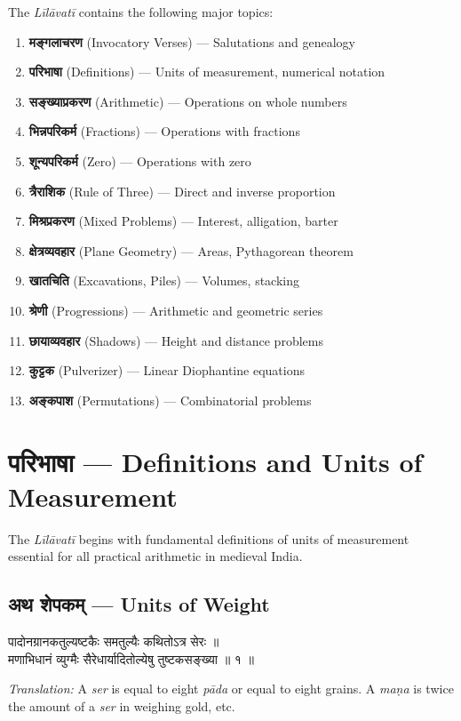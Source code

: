 \documentclass[10pt,a4paper]{article}
\newenvironment{sanskritverse}{%
  \begin{center}%
  \begin{minipage}{0.94\textwidth}%
  \centering\devanagarifont\small%
}{%
  \end{minipage}%
  \end{center}%
  \vspace{0.1em}%
}
\begin{document}
The \textit{Līlāvatī} contains the following major topics:
\begin{enumerate}[label=\arabic*., leftmargin=*,itemsep=0pt]
\item \textbf{मङ्गलाचरण} (Invocatory Verses) --- Salutations and genealogy
\item \textbf{परिभाषा} (Definitions) --- Units of measurement, numerical notation
\item \textbf{सङ्ख्याप्रकरण} (Arithmetic) --- Operations on whole numbers
\item \textbf{भिन्नपरिकर्म} (Fractions) --- Operations with fractions
\item \textbf{शून्यपरिकर्म} (Zero) --- Operations with zero
\item \textbf{त्रैराशिक} (Rule of Three) --- Direct and inverse proportion
\item \textbf{मिश्रप्रकरण} (Mixed Problems) --- Interest, alligation, barter
\item \textbf{क्षेत्रव्यवहार} (Plane Geometry) --- Areas, Pythagorean theorem
\item \textbf{खातचिति} (Excavations, Piles) --- Volumes, stacking
\item \textbf{श्रेणी} (Progressions) --- Arithmetic and geometric series
\item \textbf{छायाव्यवहार} (Shadows) --- Height and distance problems
\item \textbf{कुट्टक} (Pulverizer) --- Linear Diophantine equations
\item \textbf{अङ्कपाश} (Permutations) --- Combinatorial problems
\end{enumerate}

\section{परिभाषा — Definitions and Units of Measurement}
\label{sec:paribhasha}

The \textit{Līlāvatī} begins with fundamental definitions of units of measurement essential for all practical arithmetic in medieval India.

\subsection{अथ शेपकम् — Units of Weight}

\begin{sanskritverse}
पादोनग्रानकतुल्यष्टकैः समतुल्यैः कथितोऽत्र सेरः ॥\\
मणाभिधानं व्युग्मैः सैरेधार्यादितोल्येषु तुष्टकसङ्ख्या ॥ १ ॥
\end{sanskritverse}
\textit{Translation:} A \textit{ser} is equal to eight \textit{pāda} or equal to eight grains. A \textit{maṇa} is twice the amount of a \textit{ser} in weighing gold, etc.
\end{document}

